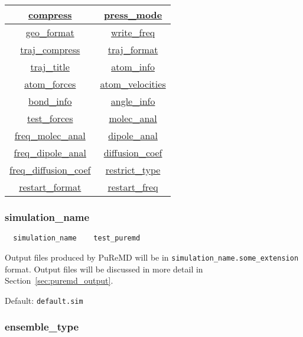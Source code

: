 \documentclass{article}
\begin{document}
\begin{center}
\begin{tabular}{|c|c|}
  \hyperref[sec:compress]{compress} & \hyperref[sec:press_mode]{press\_mode} \\ \hline
  \hyperref[sec:geo_format]{geo\_format} & \hyperref[sec:write_freq]{write\_freq} \\ \hline
  \hyperref[sec:traj_compress]{traj\_compress} & \hyperref[sec:traj_format]{traj\_format} \\ \hline
  \hyperref[sec:traj_title]{traj\_title} & \hyperref[sec:atom_info]{atom\_info} \\ \hline
  \hyperref[sec:atom_forces]{atom\_forces} & \hyperref[sec:atom_velocities]{atom\_velocities} \\ \hline
  \hyperref[sec:bond_info]{bond\_info} & \hyperref[sec:angle_info]{angle\_info} \\ \hline
  \hyperref[sec:test_forces]{test\_forces} & \hyperref[sec:molec_anal]{molec\_anal} \\ \hline
  \hyperref[sec:freq_molec_anal]{freq\_molec\_anal} & \hyperref[sec:dipole_anal]{dipole\_anal} \\ \hline
  \hyperref[sec:freq_dipole_anal]{freq\_dipole\_anal} & \hyperref[sec:diffusion_coef]{diffusion\_coef} \\ \hline
  \hyperref[sec:freq_diffusion_coef]{freq\_diffusion\_coef} & \hyperref[sec:restrict_type]{restrict\_type} \\ \hline
  \hyperref[sec:restart_format]{restart\_format} & \hyperref[sec:restart_freq]{restart\_freq} \\ \hline
\end{tabular}
\end{center}

\subsubsection{simulation\_name}
\label{sec:simulation_name}

\begin{verbatim}
  simulation_name    test_puremd
\end{verbatim}
Output files produced by PuReMD will be in 
{\tt simulation\_name.some\_extension} format. Output files will be 
discussed in more detail in Section~\ref{sec:puremd_output}.

Default: {\tt default.sim}

\subsubsection{ensemble\_type}
\label{sec:ensemble_type}
\end{document}
